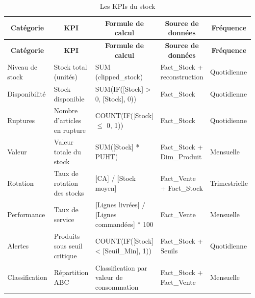{\small
\renewcommand{\arraystretch}{1.2}
\setlength{\tabcolsep}{3pt}

\begin{longtable}{|p{2.5cm}|p{3.5cm}|p{3.5cm}|p{3.5cm}|p{3cm}|}

\caption{Les KPIs du stock} \\

\hline
\multicolumn{1}{|c|}{\textbf{Catégorie}} & 
\multicolumn{1}{c|}{\textbf{KPI}} & 
\multicolumn{1}{c|}{\textbf{Formule de calcul}} & 
\multicolumn{1}{c|}{\textbf{Source de données}} & 
\multicolumn{1}{c|}{\textbf{Fréquence}} \\
\hline
\endfirsthead

\hline
\multicolumn{1}{|c|}{\textbf{Catégorie}} & 
\multicolumn{1}{c|}{\textbf{KPI}} & 
\multicolumn{1}{c|}{\textbf{Formule de calcul}} & 
\multicolumn{1}{c|}{\textbf{Source de données}} & 
\multicolumn{1}{c|}{\textbf{Fréquence}} \\
\hline
\endhead

\hline
\endfoot

Niveau de stock & Stock total (unités) & SUM (clipped\_stock) & Fact\_Stock + reconstruction & Quotidienne \\
\hline

Disponibilité & Stock disponible & SUM(IF([Stock] > 0, [Stock], 0)) & Fact\_Stock & Quotidienne \\
\hline

Ruptures & Nombre d'articles en rupture & COUNT(IF([Stock] $\leq$ 0, 1)) & Fact\_Stock & Quotidienne \\
\hline

Valeur & Valeur totale du stock & SUM([Stock] * PUHT) & Fact\_Stock + Dim\_Produit & Mensuelle \\
\hline

Rotation & Taux de rotation des stocks & [CA] / [Stock moyen] & Fact\_Vente + Fact\_Stock & Trimestrielle \\
\hline

Performance & Taux de service & [Lignes livrées] / [Lignes commandées] * 100 & Fact\_Vente & Mensuelle \\
\hline

Alertes & Produits sous seuil critique & COUNT(IF([Stock] < [Seuil\_Min], 1)) & Fact\_Stock + Seuils & Quotidienne \\
\hline

Classification & Répartition ABC & Classification par valeur de consommation & Fact\_Stock + Fact\_Vente & Mensuelle \\
\hline

\end{longtable}

}

